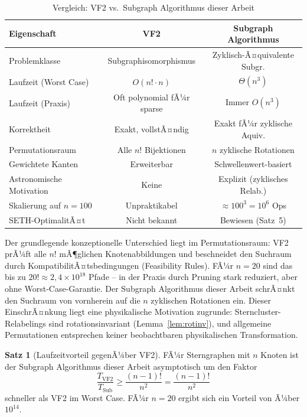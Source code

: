 ﻿\documentclass[a4paper,12pt]{report}
\theoremstyle{definition}
\newtheorem{satz}{Satz}
\begin{document}
\begin{table}[H]
\centering
\caption{Vergleich: VF2 vs.\ Subgraph Algorithmus dieser Arbeit}
\label{tab:vf2}
\begin{tabular}{lcc}
\toprule
Eigenschaft & VF2 & Subgraph Algorithmus \\
\midrule
Problemklasse           & Subgraphisomorphismus & Zyklisch-Ã¤quivalente Subgr. \\
Laufzeit (Worst Case)   & $O(n! \cdot n)$             & $\Theta(n^3)$ \\
Laufzeit (Praxis)       & Oft polynomial fÃ¼r sparse   & Immer $O(n^3)$ \\
Korrektheit             & Exakt, vollstÃ¤ndig          & Exakt fÃ¼r zyklische Aquiv. \\
Permutationsraum        & Alle $n!$ Bijektionen        & $n$ zyklische Rotationen \\
Gewichtete Kanten       & Erweiterbar                 & Schwellenwert-basiert \\
Astronomische Motivation & Keine                       & Explizit (zyklisches Relab.) \\
Skalierung auf $n=100$  & Unpraktikabel               & $\approx 100^3 = 10^6$ Ops \\
SETH-OptimalitÃ¤t        & Nicht bekannt               & Bewiesen (Satz~5) \\
\bottomrule
\end{tabular}
\end{table}

Der grundlegende konzeptionelle Unterschied liegt im Permutationsraum: VF2 prÃ¼ft alle $n!$ mÃ¶glichen Knotenabbildungen und beschneidet den Suchraum durch KompatibilitÃ¤tsbedingungen (Feasibility Rules). FÃ¼r $n = 20$ sind das bis zu $20! \approx 2{,}4 \times 10^{18}$ Pfade -- in der Praxis durch Pruning stark reduziert, aber ohne Worst-Case-Garantie. Der Subgraph Algorithmus dieser Arbeit schrÃ¤nkt den Suchraum von vornherein auf die $n$ zyklischen Rotationen ein. Dieser EinschrÃ¤nkung liegt eine physikalische Motivation zugrunde: Sterncluster-Relabelings sind rotationsinvariant (Lemma~\ref{lem:rotinv}), und allgemeine Permutationen entsprechen keiner beobachtbaren physikalischen Transformation.

\begin{satz}[Laufzeitvorteil gegenÃ¼ber VF2]
\label{satz:vf2_vorteil}
FÃ¼r Sterngraphen mit $n$ Knoten ist der Subgraph Algorithmus dieser Arbeit asymptotisch um den Faktor
\[
    \frac{T_\mathrm{VF2}}{T_\mathrm{Sub}} \geq \frac{(n-1)!}{n^2} = \frac{(n-1)!}{n^2}
\]
schneller als VF2 im Worst Case. FÃ¼r $n = 20$ ergibt sich ein Vorteil von Ã¼ber $10^{14}$.
\end{satz}
\end{document}
